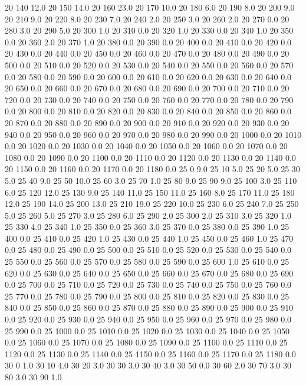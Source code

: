 20	140	12.0
20	150	14.0
20	160	23.0
20	170	10.0
20	180	6.0
20	190	8.0
20	200	9.0
20	210	9.0
20	220	8.0
20	230	7.0
20	240	2.0
20	250	3.0
20	260	2.0
20	270	0.0
20	280	3.0
20	290	5.0
20	300	1.0
20	310	0.0
20	320	1.0
20	330	0.0
20	340	1.0
20	350	0.0
20	360	2.0
20	370	1.0
20	380	0.0
20	390	0.0
20	400	0.0
20	410	0.0
20	420	0.0
20	430	0.0
20	440	0.0
20	450	0.0
20	460	0.0
20	470	0.0
20	480	0.0
20	490	0.0
20	500	0.0
20	510	0.0
20	520	0.0
20	530	0.0
20	540	0.0
20	550	0.0
20	560	0.0
20	570	0.0
20	580	0.0
20	590	0.0
20	600	0.0
20	610	0.0
20	620	0.0
20	630	0.0
20	640	0.0
20	650	0.0
20	660	0.0
20	670	0.0
20	680	0.0
20	690	0.0
20	700	0.0
20	710	0.0
20	720	0.0
20	730	0.0
20	740	0.0
20	750	0.0
20	760	0.0
20	770	0.0
20	780	0.0
20	790	0.0
20	800	0.0
20	810	0.0
20	820	0.0
20	830	0.0
20	840	0.0
20	850	0.0
20	860	0.0
20	870	0.0
20	880	0.0
20	890	0.0
20	900	0.0
20	910	0.0
20	920	0.0
20	930	0.0
20	940	0.0
20	950	0.0
20	960	0.0
20	970	0.0
20	980	0.0
20	990	0.0
20	1000	0.0
20	1010	0.0
20	1020	0.0
20	1030	0.0
20	1040	0.0
20	1050	0.0
20	1060	0.0
20	1070	0.0
20	1080	0.0
20	1090	0.0
20	1100	0.0
20	1110	0.0
20	1120	0.0
20	1130	0.0
20	1140	0.0
20	1150	0.0
20	1160	0.0
20	1170	0.0
20	1180	0.0
25	0	9.0
25	10	5.0
25	20	5.0
25	30	5.0
25	40	9.0
25	50	10.0
25	60	3.0
25	70	1.0
25	80	9.0
25	90	9.0
25	100	3.0
25	110	6.0
25	120	12.0
25	130	9.0
25	140	11.0
25	150	11.0
25	160	8.0
25	170	11.0
25	180	12.0
25	190	14.0
25	200	13.0
25	210	19.0
25	220	10.0
25	230	6.0
25	240	7.0
25	250	5.0
25	260	5.0
25	270	3.0
25	280	6.0
25	290	2.0
25	300	2.0
25	310	3.0
25	320	1.0
25	330	4.0
25	340	1.0
25	350	0.0
25	360	3.0
25	370	0.0
25	380	0.0
25	390	1.0
25	400	0.0
25	410	0.0
25	420	1.0
25	430	0.0
25	440	1.0
25	450	0.0
25	460	1.0
25	470	0.0
25	480	0.0
25	490	0.0
25	500	0.0
25	510	0.0
25	520	0.0
25	530	0.0
25	540	0.0
25	550	0.0
25	560	0.0
25	570	0.0
25	580	0.0
25	590	0.0
25	600	1.0
25	610	0.0
25	620	0.0
25	630	0.0
25	640	0.0
25	650	0.0
25	660	0.0
25	670	0.0
25	680	0.0
25	690	0.0
25	700	0.0
25	710	0.0
25	720	0.0
25	730	0.0
25	740	0.0
25	750	0.0
25	760	0.0
25	770	0.0
25	780	0.0
25	790	0.0
25	800	0.0
25	810	0.0
25	820	0.0
25	830	0.0
25	840	0.0
25	850	0.0
25	860	0.0
25	870	0.0
25	880	0.0
25	890	0.0
25	900	0.0
25	910	0.0
25	920	0.0
25	930	0.0
25	940	0.0
25	950	0.0
25	960	0.0
25	970	0.0
25	980	0.0
25	990	0.0
25	1000	0.0
25	1010	0.0
25	1020	0.0
25	1030	0.0
25	1040	0.0
25	1050	0.0
25	1060	0.0
25	1070	0.0
25	1080	0.0
25	1090	0.0
25	1100	0.0
25	1110	0.0
25	1120	0.0
25	1130	0.0
25	1140	0.0
25	1150	0.0
25	1160	0.0
25	1170	0.0
25	1180	0.0
30	0	1.0
30	10	4.0
30	20	3.0
30	30	3.0
30	40	3.0
30	50	0.0
30	60	2.0
30	70	3.0
30	80	3.0
30	90	1.0
